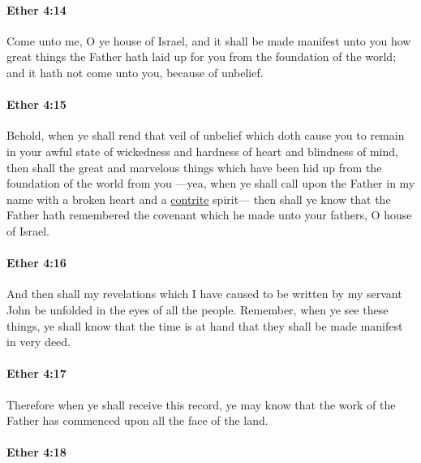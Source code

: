		\paragraph{Ether 4:14} %
			\label{ETHER-4-14}

			Come unto me, O ye house of Israel,
			and it shall be made manifest unto you
			how great things the Father hath laid up for you
			from the foundation of the world;
			and it hath not come unto you,
			because of unbelief.

		\paragraph{Ether 4:15} %
			\label{ETHER-4-15}

			Behold, when ye shall rend that veil of unbelief
			which doth cause you to remain in your awful state of wickedness
			and hardness of heart and blindness of mind,
			then shall the great and marvelous things
			which have been hid up from the foundation of the world from you
			---yea, when ye shall call upon the Father in my name
			with a broken heart and a \hyperref[CONTRITE]{contrite} spirit---
			then shall ye know that the Father hath remembered the covenant
			which he made unto your fathers, O house of Israel.

		\paragraph{Ether 4:16} %
			\label{ETHER-4-16}

			And then shall my revelations
			which I have caused to be written by my servant John
			be unfolded in the eyes of all the people.
			Remember, when ye see these things,
			ye shall know that the time is at hand
			that they shall be made manifest in very deed.

		\paragraph{Ether 4:17} %
			\label{ETHER-4-17}

			Therefore when ye shall receive this record,
			ye may know that the work of the Father has commenced
			upon all the face of the land.

		\paragraph{Ether 4:18} %
			\label{ETHER-4-18}

